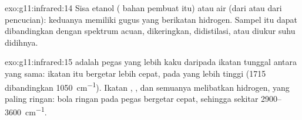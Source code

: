 \begin{solution}{exo:g11:infrared:14}
Sisa etanol ( bahan pembuat  itu) atau air (dari  atau
dari pencucian): keduanya memiliki gugus  yang berikatan
hidrogen. Sampel itu dapat dibandingkan dengan spektrum acuan,
dikeringkan, didistilasi, atau diukur suhu didihnya.
\end{solution}

\begin{solution}{exo:g11:infrared:15}
 adalah pegas yang lebih kaku daripada ikatan tunggal
antara  yang sama: ikatan itu bergetar lebih cepat, pada
 yang lebih tinggi (1715 dibandingkan
\qty{1050}{cm^{-1}}). Ikatan , , dan  semuanya
melibatkan  hidrogen, yang paling ringan: bola ringan pada pegas
bergetar cepat, sehingga  sekitar
2900--\qty{3600}{cm^{-1}}.
\end{solution}

